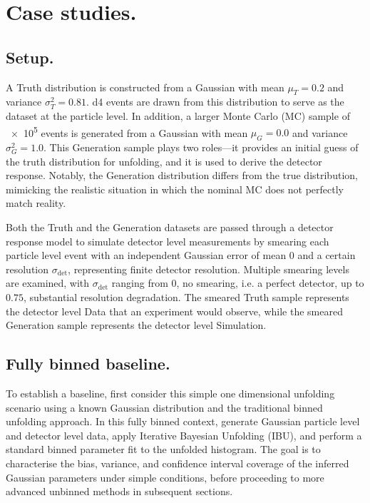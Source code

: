 \section{Case studies.}
\label{sec:case-studies}
\sectionminitoc
    \subsection{Setup.}
    \label{subsec:setup}
        A Truth distribution is constructed from a Gaussian with mean $\mu_{T}=0.2$ and variance $\sigma^2_{T}=0.81$.
        \num{d4} events are drawn from this distribution to serve as the dataset at the particle level.
        In addition, a larger Monte Carlo (MC) sample of \num{e5} events is generated from a Gaussian with mean \(\mu_G = 0.0\) and variance \(\sigma^2_G = 1.0.\)
        This Generation sample plays two roles---it provides an initial guess of the truth distribution for unfolding, and it is used to derive the detector response.
        Notably, the Generation distribution differs from the true distribution, mimicking the realistic situation in which the nominal MC does not perfectly match reality.

        Both the Truth and the Generation datasets are passed through a detector response model to simulate detector level measurements by smearing each particle level event with an independent Gaussian error of mean 0 and a certain resolution $\sigma_{\text{det}}$, representing finite detector resolution.
        Multiple smearing levels are examined, with $\sigma_{\text{det}}$ ranging from \(0\), no smearing, i.e. a perfect detector, up to \(0.75\), substantial resolution degradation.
        The smeared Truth sample represents the detector level Data that an experiment would observe, while the smeared Generation sample represents the detector level Simulation.
        
    \subsection{Fully binned baseline.}
    \label{subsec:fully_binned_demo}
        To establish a baseline, first consider this simple one dimensional unfolding scenario using a known Gaussian distribution and the traditional binned unfolding approach.
        In this fully binned context, generate Gaussian particle level and detector level data, apply Iterative Bayesian Unfolding (IBU), and perform a standard binned parameter fit to the unfolded histogram.
        The goal is to characterise the bias, variance, and confidence interval coverage of the inferred Gaussian parameters under simple conditions, before proceeding to more advanced unbinned methods in subsequent sections.
        
